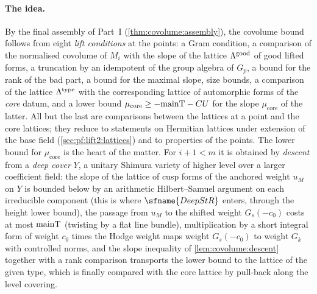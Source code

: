 \paragraph{The idea.} By the final assembly of Part~I (\cref{thm:covolume:assembly}), the covolume bound
follows from eight \emph{lift conditions} at the points: a Gram condition, a comparison of the normalised
covolume of $M_i$ with the slope of the lattice $\Lambda^{\mathrm{good}}$ of good lifted forms, a truncation by an
idempotent of the group algebra of $G_p$, a bound for the rank of the bad part, a bound for the maximal
slope, size bounds, a comparison of the lattice $\Lambda^{\mathrm{type}}$ with the corresponding lattice of
automorphic forms of the \emph{core} datum, and a lower bound $\mu_{\mathrm{core}}\ge-\mathrm{mainT}-CU$ for the
slope $\mu_{\mathrm{core}}$ of the latter. All but the last are comparisons between the lattices at a point
and the core lattices; they reduce to statements on Hermitian lattices under extension of the base field
(\cref{sec:pf:lift2:lattices}) and to properties of the points. The lower bound for $\mu_{\mathrm{core}}$ is
the heart of the matter. For $i+1<m$ it is obtained by \emph{descent} from a \emph{deep cover} $Y$, a unitary
Shimura variety of higher level over a larger coefficient field: the slope of the lattice of cusp forms of
the anchored weight $u_M$ on $Y$ is bounded below by an arithmetic Hilbert--Samuel argument on each
irreducible component (this is where $\sfname{DeepStR}$ enters, through the height lower bound), the passage
from $u_M$ to the shifted weight $G_s(-c_0)$ costs at most $\mathrm{mainT}$ (twisting by a flat line bundle),
multiplication by a short integral form of weight $c_0$ times the Hodge weight maps weight $G_s(-c_0)$ to
weight $G_k$ with controlled norms, and the slope inequality of \cref{lem:covolume:descent} together with a
rank comparison transports the lower bound to the lattice of the given type, which is finally compared with
the core lattice by pull-back along the level covering.


